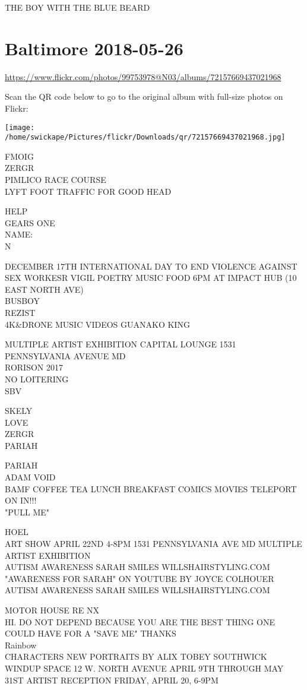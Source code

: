 \documentclass[10pt,letterpaper]{article}
\begin{document}
THE BOY WITH THE BLUE BEARD


\section*{Baltimore 2018-05-26}

\url{https://www.flickr.com/photos/99753978@N03/albums/72157669437021968}

Scan the QR code below to go to the original album with full-size photos on Flickr:

\texttt{[image: /home/swickape/Pictures/flickr/Downloads/qr/72157669437021968.jpg]}


FMOIG\\
ZERGR\\
PIMLICO RACE COURSE\\
LYFT FOOT TRAFFIC FOR GOOD HEAD

HELP\\
GEARS ONE\\
NAME:\\
N

DECEMBER 17TH INTERNATIONAL DAY TO END VIOLENCE AGAINST SEX WORKESR VIGIL POETRY MUSIC FOOD 6PM AT IMPACT HUB (10 EAST NORTH AVE)\\
BUSBOY\\
REZIST\\
4K\&DRONE MUSIC VIDEOS GUANAKO KING

MULTIPLE ARTIST EXHIBITION CAPITAL LOUNGE 1531 PENNSYLVANIA AVENUE MD\\
RORISON 2017\\
NO LOITERING\\
SBV

SKELY\\
LOVE\\
ZERGR\\
PARIAH

PARIAH\\
ADAM VOID\\
BAMF COFFEE TEA LUNCH BREAKFAST COMICS MOVIES TELEPORT ON IN!!!\\
"PULL ME"

HOEL\\
ART SHOW APRIL 22ND 4{-}8PM 1531 PENNSYLVANIA AVE MD MULTIPLE ARTIST EXHIBITION\\
AUTISM AWARENESS SARAH SMILES WILLSHAIRSTYLING.COM "AWARENESS FOR SARAH" ON YOUTUBE BY JOYCE COLHOUER\\
AUTISM AWARENESS SARAH SMILES WILLSHAIRSTYLING.COM

MOTOR HOUSE RE NX\\
HI.  DO NOT DEPEND BECAUSE YOU ARE THE BEST THING ONE COULD HAVE FOR A "SAVE ME" THANKS\\
Rainbow\\
CHARACTERS NEW PORTRAITS BY ALIX TOBEY SOUTHWICK WINDUP SPACE 12 W. NORTH AVENUE APRIL 9TH THROUGH MAY 31ST ARTIST RECEPTION FRIDAY, APRIL 20, 6{-}9PM
\end{document}
